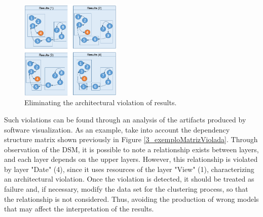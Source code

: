 \documentclass{sig-alternate-05-2015}
\begin{document}
\begin{figure}[!h]
	\centering
	\includegraphics[width=0.43\textwidth]{exemplo_comparacao_modelos_2_en}
	\caption{Eliminating the architectural violation of results.}
	\label{exemplo_comparacao_modelos2}
\end{figure}

Such violations can be found through an analysis of the artifacts produced by software visualization. As an example, take into account the dependency structure matrix shown previously in Figure \ref{3_exemploMatrizViolada}. Through observation of the DSM, it is possible to note a relationship exists between layers, and each layer depends on the upper layers. However, this relationship is violated by layer "Date" (4), since it uses resources of the layer  "View" (1), characterizing an architectural violation. Once the violation is detected, it should be treated as failure and, if necessary, modify the data set for the clustering process, so that the relationship is not considered. Thus, avoiding the production of wrong models that may affect the interpretation of the results.





\end{document}
